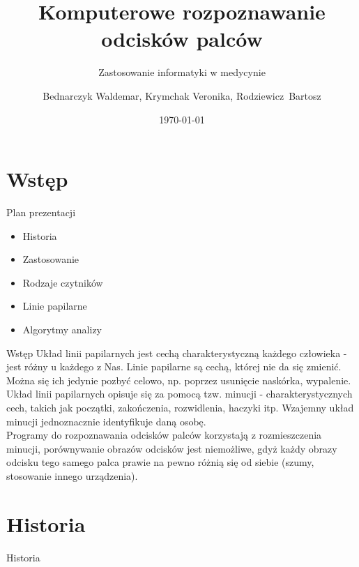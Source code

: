 \documentclass{beamer}
\title{Komputerowe rozpoznawanie odcisków palców}
\subtitle{Zastosowanie informatyki w medycynie}
\author{Bednarczyk Waldemar, Krymchak Veronika, Rodziewicz~Bartosz}
\institute{Politechnika Wrocławska}
\date{\today}
\begin{document}
\begin{frame}
    \titlepage
\end{frame}

\section{Wstęp}

\begin{frame}{Plan prezentacji}
    \huge
    \begin{itemize}
        \item[] \centering Historia
        \item[] Zastosowanie
        \item[] Rodzaje czytników
        \item[] Linie papilarne
        \item[] Algorytmy analizy
    \end{itemize}
\end{frame}

\begin{frame}{Wstęp}
    \justifying
    Układ linii papilarnych jest cechą charakterystyczną każdego człowieka - jest różny u każdego z Nas. Linie papilarne są cechą, której nie da się zmienić. Można się ich jedynie pozbyć celowo, np. poprzez usunięcie naskórka, wypalenie. Układ linii papilarnych opisuje się za pomocą tzw. minucji - charakterystycznych cech, takich jak początki, zakończenia, rozwidlenia, haczyki itp. Wzajemny układ minucji jednoznacznie identyfikuje daną osobę. \\
    Programy do rozpoznawania odcisków palców korzystają z rozmieszczenia minucji, porównywanie obrazów odcisków jest niemożliwe, gdyż każdy obrazy odcisku tego samego palca prawie na pewno różnią się od siebie (szumy, stosowanie innego urządzenia).
\end{frame}

\section{Historia}

\begin{frame}
    \centering
    \huge
    Historia
\end{frame}
\end{document}
